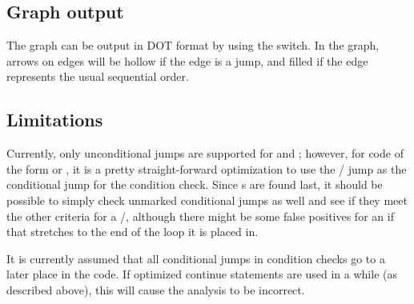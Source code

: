 \subsection{Graph output}
The graph can be output in DOT format by using the  switch. In the graph, arrows on edges will be hollow if the edge is a jump, and filled if the edge represents the usual sequential order.

\subsection{Limitations}
Currently, only unconditional jumps are supported for  and ; however, for code of the form  or , it is a pretty straight-forward optimization to use the / jump as the conditional jump for the  condition check. Since s are found last, it should be possible to simply check unmarked conditional jumps as well and see if they meet the other criteria for a /, although there might be some false positives for an if that stretches to the end of the loop it is placed in.

It is currently assumed that all conditional jumps in  condition checks go to a later place in the code. If optimized continue statements are used in a while (as described above), this will cause the analysis to be incorrect.
